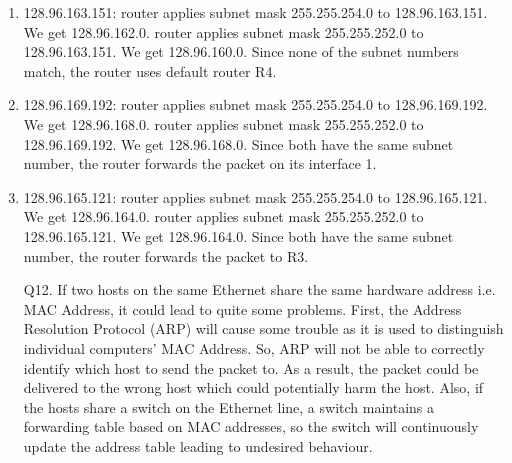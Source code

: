 \documentclass{csc_assignment}
\begin{document}
\begin{description}
\begin{enumerate}
\item 128.96.163.151: router applies subnet mask 255.255.254.0 to 128.96.163.151. We get 128.96.162.0. router applies subnet mask 255.255.252.0 to 128.96.163.151. We get 128.96.160.0. Since none of the subnet numbers match, the router uses default router R4. 

\item 128.96.169.192: router applies subnet mask 255.255.254.0 to 128.96.169.192. We get 128.96.168.0. router applies subnet mask 255.255.252.0 to 128.96.169.192. We get 128.96.168.0. Since both have the same subnet number, the router forwards the packet on its interface 1.  

\item 128.96.165.121: router applies subnet mask 255.255.254.0 to 128.96.165.121. We get 128.96.164.0. router applies subnet mask 255.255.252.0 to 128.96.165.121. We get 128.96.164.0. Since both have the same subnet number, the router forwards the packet to R3.


\item[Q12.]  
If two hosts on the same Ethernet share the same hardware address i.e. MAC Address, it could lead to quite some problems. First, the Address Resolution Protocol (ARP) will cause some trouble as it is used to distinguish individual computers' MAC Address. So, ARP will not be able to correctly identify which host to send the packet to. As a result, the packet could be delivered to the wrong host which could potentially harm the host. Also, if the hosts share a switch on the Ethernet line, a switch maintains a forwarding table based on MAC addresses, so the switch will continuously update the address table leading to undesired behaviour. 

\end{enumerate}

\end{description}
\end{document}
